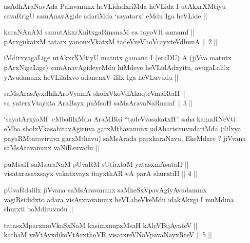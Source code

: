 \begin{artha}
asAdhAraNavAda Palavanunx heVLidadxriMda heVLida I utAkxrXMtiyu
savaRrigU samAnavAgide adariMda `sayatarx' eMdu Iga heVLide ||
\end{artha}


\begin{shl}
karaNAnAM samutAkxrXnitxgaRmanaM ca tayoVH samamf || \\
pArxgukatxM tatarx yanonxVkatxM tadeVveVhoVcayxteV\s dhunA ||  2 ||  
\end{shl}

\begin{artha}
iMdirxyagaLige utAkxrXMtiyU matutx gamana I (eraDU) A (jiVva matutx
pArxNigaLige) samAnavAgideyeMdu hiMdeye heVLidAdxyitu, avugaLalilx
yAvudanunx heVLilalxvo adanenxV ililx Iga heVLuvudu ||
\end{artha}


\begin{shl}
saMsArasAyxdhikAroV\s yamA sholxVkoVdAhaqteVmaRtaH || \\
sa yaterxVtayxta AraBayx puMsaH saMsAravaNaRnamf ||  3 ||  
\end{shl}

\begin{artha}
`sayatArxyaMf' eMbalilxMda AraMBisi ``tadeVvasakatxH'' saha kamaRNeVti
eMba sholxVkasahitavAgiruva garxMthavanunx udAharisiruvudariMda
(ililxya payaRMtaraviruva garxMthavu) saMsArada parxkaraNavu,
EkeMdare ? jiVvana saMsAravanunx vaNiRsuvadu ||
\end{artha}


\begin{shl}
puMsaH saMsaraNaM pUvaRM sUtirxtaM yatasxmAsataH || \\
visatxrasatxsayx vakatxvayx itayxthAR vA parA shurxtiH ||  4 ||  
\end{shl}

\begin{artha}
pUvaRdalilx jiVvana saMsAravanunx saMkeSxVpavAgiyAvudanunx
vagiRsididxto adara visAtxravanunx heVLabeVkeMdu idakAkxgi I muMdina
shurxti baMdiruvudu ||
\end{artha}

\begin{shl}
tatasxMparxmoVkaSxNaM kasimxnupxMsaH kAleV\s BijAyateV || \\
kathaM veVtAyxdikoV\s tArxthoVR visatxreVNoVpavaNayxRteV ||  5 ||  
\end{shl}

